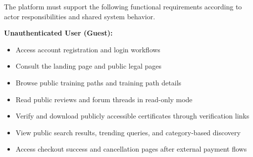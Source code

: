 The platform must support the following functional requirements according to actor
responsibilities and shared system behavior.

\textbf{Unauthenticated User (Guest):}
\begin{itemize}[label=-]
    \item Access account registration and login workflows
    \item Consult the landing page and public legal pages
    \item Browse public training paths and training path details
    \item Read public reviews and forum threads in read-only mode
    \item Verify and download publicly accessible certificates through verification
          links
    \item View public search results, trending queries, and category-based discovery
    \item Access checkout success and cancellation pages after external payment flows
\end{itemize}

